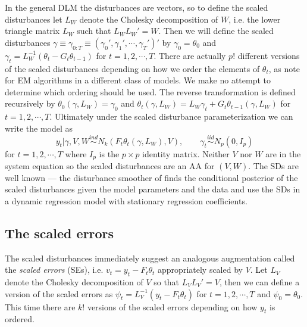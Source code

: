 \documentclass[12pt]{article}
\begin{document}
In the general DLM the disturbances are vectors, so to define the scaled disturbances let $L_W$ denote the Cholesky decomposition of $W$, i.e. the lower triangle matrix $L_W$ such that $L_WL_W' =W$. Then we will define the scaled disturbances $\gamma\equiv\gamma_{0:T}\equiv(\gamma_0',\gamma_1',\cdots,\gamma_T')'$ by $\gamma_0=\theta_0$ and $\gamma_t = L_W^{-1}(\theta_t-G_t\theta_{t-1})$ for $t=1,2,\cdots,T$. There are actually $p!$ different versions of the scaled disturbances depending on how we order the elements of $\theta_t$, as \citet{meng1998fast} note for EM algorithms in a different class of models. We make no attempt to determine which ordering should be used.
The reverse transformation is defined recursively by $\theta_0(\gamma,L_W)=\gamma_0$ and $\theta_t(\gamma,L_W)=L_W\gamma_t + G_t\theta_{t-1}(\gamma,L_W)$ for $t=1,2,\cdots,T$. Ultimately under the scaled disturbance parameterization we can write the model as
\begin{equation}
  y_t|\gamma,V,W  \stackrel{ind}{\sim} N_k\left(F_t\theta_t(\gamma,L_W), V\right), \qquad
  \gamma_t  \stackrel{iid}{\sim}N_p(0,I_p) \label{dlmdistmodel}
\end{equation}
for $t=1,2,\cdots,T$ where $I_p$ is the $p\times p$ identity matrix. Neither $V$ nor $W$ are in the system equation so the scaled disturbances are an AA for $(V,W)$. The SDs are well known --- the disturbance smoother of \citet{koopman1993disturbance} finds the conditional posterior of the scaled disturbances given the model parameters and the data and \citet{fruhwirth2004efficient} use the SDs in a dynamic regression model with stationary regression coefficients.

\subsection{The scaled errors}\label{sec:DAs:error}
The scaled disturbances immediately suggest an analogous augmentation called the {\it scaled errors} (SEs), i.e. $v_t=y_t - F_t\theta_t$ appropriately scaled by $V$. Let $L_V$ denote the Cholesky decomposition of $V$ so that $L_VL_V'=V$, then we can define a version of the scaled errors as $\psi_t = L_V^{-1}(y_t - F_t\theta_t)$ for $t=1,2,\cdots,T$ and $\psi_0 = \theta_0$. This time there are $k!$ versions of the scaled errors depending on how $y_t$ is ordered.

\end{document}
